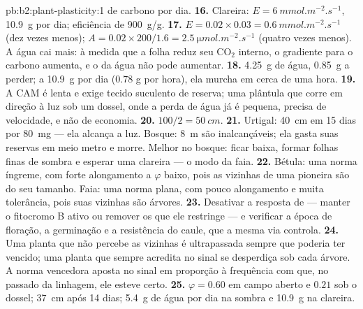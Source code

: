 \begin{solution}{pb:b2:plant-plasticity:1}
de carbono por dia.
\textbf{16.} Clareira: $E = \qty{6}{mmol.m^{-2}.s^{-1}}$, \qty{10.9}{g}
por dia; eficiência de \qty{900}{g/g}.
\textbf{17.} $E = 0.02\times 0.03 = \qty{0.6}{mmol.m^{-2}.s^{-1}}$
(dez vezes menos); $A = 0.02\times 200/1.6 = \qty{2.5}{\micro
mol.m^{-2}.s^{-1}}$ (quatro vezes menos). A água cai mais: à medida que
a folha reduz seu $\mathrm{CO_2}$ interno, o gradiente para o carbono
aumenta, e o da água não pode aumentar.
\textbf{18.} \qty{4.25}{g} de água, \qty{0.85}{g} a perder; a
\qty{10.9}{g} por dia ($0.78$ g por hora), ela murcha em cerca de uma
hora.
\textbf{19.} A CAM é lenta e exige tecido suculento de reserva; uma
plântula que corre em direção à luz sob um dossel, onde a perda de água
já é pequena, precisa de velocidade, e não de economia.
\textbf{20.} $100/2 = \qty{50}{cm}$.
\textbf{21.} Urtigal: \qty{40}{cm} em 15 dias por \qty{80}{mg} --- ela
alcança a luz. Bosque: \qty{8}{m} são inalcançáveis; ela gasta suas
reservas em meio metro e morre. Melhor no bosque: ficar baixa, formar
folhas finas de sombra e esperar uma clareira --- o modo da faia.
\textbf{22.} Bétula: uma norma íngreme, com forte alongamento a
$\varphi$ baixo, pois as vizinhas de uma pioneira são do seu tamanho.
Faia: uma norma plana, com pouco alongamento e muita tolerância, pois
suas vizinhas são árvores.
\textbf{23.} Desativar a resposta de  --- manter o
fitocromo B ativo ou remover os  que ele
restringe --- e verificar a época de floração, a germinação e a
resistência do caule, que a mesma via controla.
\textbf{24.} Uma planta que não percebe as vizinhas é ultrapassada
sempre que poderia ter vencido; uma planta que sempre acredita no sinal
se desperdiça sob cada árvore. A norma vencedora aposta no sinal em
proporção à frequência com que, no passado da linhagem, ele esteve
certo.
\textbf{25.} $\varphi = 0.60$ em campo aberto e $0.21$ sob o dossel;
\qty{37}{cm} após 14 dias; \qty{5.4}{g} de água por dia na sombra e
\qty{10.9}{g} na clareira.
\end{solution}
